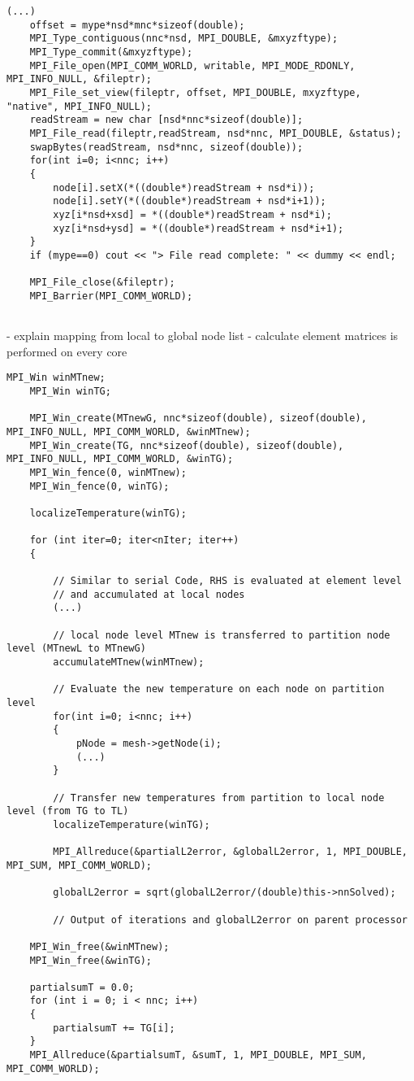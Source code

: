 \begin{lstlisting}[caption={\label{Code:MPI2} Read file for every rank with specific offset}]
	(...)
	offset = mype*nsd*mnc*sizeof(double);
	MPI_Type_contiguous(nnc*nsd, MPI_DOUBLE, &mxyzftype);
	MPI_Type_commit(&mxyzftype);
	MPI_File_open(MPI_COMM_WORLD, writable, MPI_MODE_RDONLY, MPI_INFO_NULL, &fileptr);
	MPI_File_set_view(fileptr, offset, MPI_DOUBLE, mxyzftype, "native", MPI_INFO_NULL);
	readStream = new char [nsd*nnc*sizeof(double)];
	MPI_File_read(fileptr,readStream, nsd*nnc, MPI_DOUBLE, &status);
	swapBytes(readStream, nsd*nnc, sizeof(double));
	for(int i=0; i<nnc; i++)
	{
		node[i].setX(*((double*)readStream + nsd*i));
		node[i].setY(*((double*)readStream + nsd*i+1));
		xyz[i*nsd+xsd] = *((double*)readStream + nsd*i);
		xyz[i*nsd+ysd] = *((double*)readStream + nsd*i+1);
	}
	if (mype==0) cout << "> File read complete: " << dummy << endl;
	
	MPI_File_close(&fileptr);
	MPI_Barrier(MPI_COMM_WORLD);
	
\end{lstlisting}

- explain mapping from local to global node list
- calculate element matrices is performed on every core

\begin{lstlisting}[caption={\label{Code:MPI3} Explicit solver for MPI parallelization}]
	MPI_Win winMTnew;
	MPI_Win winTG;
	
	MPI_Win_create(MTnewG, nnc*sizeof(double), sizeof(double), MPI_INFO_NULL, MPI_COMM_WORLD, &winMTnew);
	MPI_Win_create(TG, nnc*sizeof(double), sizeof(double), MPI_INFO_NULL, MPI_COMM_WORLD, &winTG);
	MPI_Win_fence(0, winMTnew);
	MPI_Win_fence(0, winTG);
	
	localizeTemperature(winTG);
	
	for (int iter=0; iter<nIter; iter++)
	{
		
		// Similar to serial Code, RHS is evaluated at element level
		// and accumulated at local nodes
		(...)
		 
		// local node level MTnew is transferred to partition node level (MTnewL to MTnewG)
		accumulateMTnew(winMTnew);
		
		// Evaluate the new temperature on each node on partition level
		for(int i=0; i<nnc; i++)
		{
			pNode = mesh->getNode(i);
			(...)
		}
		
		// Transfer new temperatures from partition to local node level (from TG to TL)
		localizeTemperature(winTG);
		
		MPI_Allreduce(&partialL2error, &globalL2error, 1, MPI_DOUBLE, MPI_SUM, MPI_COMM_WORLD);
		
		globalL2error = sqrt(globalL2error/(double)this->nnSolved);
		
		// Output of iterations and globalL2error on parent processor
	
	MPI_Win_free(&winMTnew);
	MPI_Win_free(&winTG);
	
	partialsumT = 0.0;
	for (int i = 0; i < nnc; i++)
	{
		partialsumT += TG[i];
	}
	MPI_Allreduce(&partialsumT, &sumT, 1, MPI_DOUBLE, MPI_SUM, MPI_COMM_WORLD);
\end{lstlisting}

